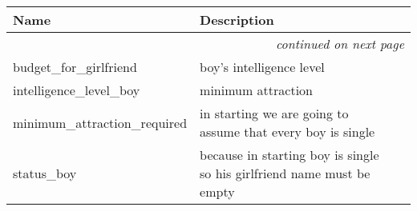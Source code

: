     \vspace{-1cm}
\hspace{\varindent}\begin{longtable}{|p{\varnamewidth}|p{\vardescrwidth}|l}
\cline{1-2}
\cline{1-2} \centering \textbf{Name} & \centering \textbf{Description}& \\
\cline{1-2}
\endhead\cline{1-2}\multicolumn{3}{r}{\small\textit{continued on next page}}\\\endfoot\cline{1-2}
\endlastfoot\raggedright b\-u\-d\-g\-e\-t\-\_\-f\-o\-r\-\_\-g\-i\-r\-l\-f\-r\-i\-e\-n\-d\- & boy's intelligence level&\\
\cline{1-2}
\raggedright i\-n\-t\-e\-l\-l\-i\-g\-e\-n\-c\-e\-\_\-l\-e\-v\-e\-l\-\_\-b\-o\-y\- & minimum attraction&\\
\cline{1-2}
\raggedright m\-i\-n\-i\-m\-u\-m\-\_\-a\-t\-t\-r\-a\-c\-t\-i\-o\-n\-\_\-r\-e\-q\-u\-i\-r\-e\-d\- & in starting we are going to assume that every boy is single&\\
\cline{1-2}
\raggedright s\-t\-a\-t\-u\-s\-\_\-b\-o\-y\- & because in starting boy is single so his girlfriend name must be 
          empty&\\
\cline{1-2}
\end{longtable}

